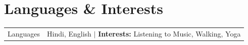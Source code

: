 \documentclass[a4paper,10pt]{article}
\newcommand{\customHeading}[1]{
    \section{\texorpdfstring{#1 \hrulefill}{}}
}
\begin{document}
\customHeading{Languages \& Interests}
\begin{tabularx}{\linewidth}{@{}l X@{}}
Languages &  \normalsize{Hindi, English \quad $|$ \quad \textbf{Interests:} Listening to Music, Walking, Yoga}\\
\end{tabularx}


\vfill
\end{document}
